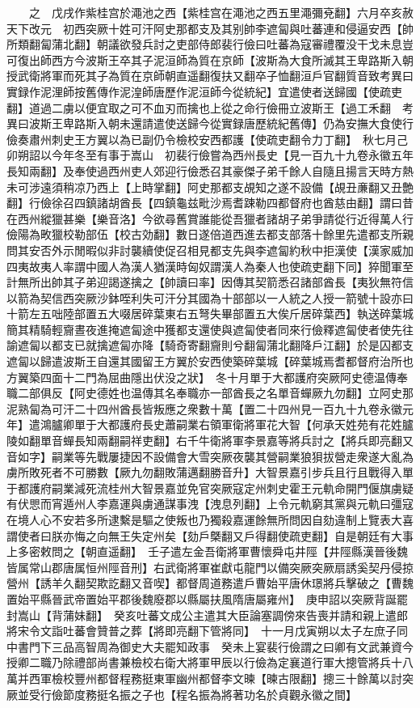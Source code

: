 　　之　戊戌作紫桂宫於澠池之西【紫桂宫在澠池之西五里澠彌兗翻】六月卒亥赦天下改元　初西突厥十姓可汗阿史那都支及其别帥李遮匐與吐蕃連和侵逼安西【帥所類翻匐蒲北翻】朝議欲發兵討之吏部侍郎裴行儉曰吐蕃為寇審禮覆没干戈未息豈可復出師西方今波斯王卒其子泥洹師為質在京師【波斯為大食所滅其王卑路斯入朝授武衛將軍而死其子為質在京師朝直遥翻復扶又翻卒子恤翻洹戶官翻質音致考異曰實録作泥浬師按舊傳作泥湟師唐歷作泥洹師今從統紀】宜遣使者送歸國【使疏吏翻】道過二虜以便宜取之可不血刃而擒也上從之命行儉冊立波斯王【過工禾翻　考異曰波斯王卑路斯入朝未還請遣使送歸今從實録唐歷統紀舊傳】仍為安撫大食使行儉奏肅州刺史王方翼以為已副仍令檢校安西都護【使疏吏翻令力丁翻】　秋七月己卯朔詔以今年冬至有事于嵩山　初裴行儉嘗為西州長史【見一百九十九卷永徽五年長知兩翻】及奉使過西州吏人郊迎行儉悉召其豪傑子弟千餘人自隨且揚言天時方熱未可涉遠須稍凉乃西上【上時掌翻】阿史那都支覘知之遂不設備【覘丑亷翻又丑艶翻】行儉徐召四鎮諸胡酋長【四鎮龜兹毗沙焉耆踈勒四都督府也酋慈由翻】謂曰昔在西州縱獵甚樂【樂音洛】今欲尋舊賞誰能從吾獵者諸胡子弟爭請從行近得萬人行儉陽為畋獵校勒部伍【校古効翻】數日遂倍道西進去都支部落十餘里先遣都支所親問其安否外示閒暇似非討襲續使促召相見都支先與李遮匐約秋中拒漢使【漢家威加四夷故夷人率謂中國人為漢人猶漢時匈奴謂漢人為秦人也使疏吏翻下同】猝聞軍至計無所出帥其子弟迎謁遂擒之【帥讀曰率】因傳其契箭悉召諸部酋長【夷狄無符信以箭為契信西突厥沙鉢咥利失可汗分其國為十部部以一人統之人授一箭號十設亦曰十箭左五咄陸部置五大啜居碎葉東右五弩失畢部置五大俟斤居碎葉西】執送碎葉城簡其精騎輕齎晝夜進掩遮匐途中獲都支還使與遮匐使者同來行儉釋遮匐使者使先往諭遮匐以都支已就擒遮匐亦降【騎奇寄翻齎則兮翻匐蒲北翻降戶江翻】於是囚都支遮匐以歸遣波斯王自還其國留王方翼於安西使築碎葉城【碎葉城焉耆都督府治所也方翼築四面十二門為屈曲隱出伏没之狀】　冬十月單于大都護府突厥阿史德温傳奉職二部俱反【阿史德姓也温傳其名奉職亦一部酋長之名單音蟬厥九勿翻】立阿史那泥熟匐為可汗二十四州酋長皆叛應之衆數十萬【置二十四州見一百九十九卷永徽元年】遣鴻臚卿單于大都護府長史蕭嗣業右領軍衛將軍花大智【何承天姓苑有花姓臚陵如翻單音蟬長知兩翻嗣祥吏翻】右千牛衛將軍李景嘉等將兵討之【將兵即亮翻又音如字】嗣業等先戰屢捷因不設備會大雪突厥夜襲其營嗣業狼狽拔營走衆遂大亂為虜所敗死者不可勝數【厥九勿翻敗蒲邁翻勝音升】大智景嘉引步兵且行且戰得入單于都護府嗣業減死流桂州大智景嘉並免官突厥寇定州刺史霍王元軌命開門偃旗虜疑有伏愳而宵遁州人李嘉運與虜通謀事洩【洩息列翻】上令元軌窮其黨與元軌曰彊寇在境人心不安若多所逮繫是驅之使叛也乃獨殺嘉運餘無所問因自劾違制上覽表大喜謂使者曰朕亦悔之向無王失定州矣【劾戶槩翻又戶得翻使疏吏翻】自是朝廷有大事上多密敕問之【朝直遥翻】　壬子遣左金吾衛將軍曹懷舜屯井陘【井陘縣漢晉後魏皆属常山郡唐属恒州陘音刑】右武衛將軍崔獻屯龍門以備突厥突厥扇誘奚契丹侵掠營州【誘羊久翻契欺訖翻又音喫】都督周道務遣戶曹始平唐休璟將兵擊破之【曹魏置始平縣晉武帝置始平郡後魏廢郡以縣屬扶風隋唐屬雍州】　庚申詔以突厥背誕罷封嵩山【背蒲妹翻】　癸亥吐蕃文成公主遣其大臣論塞調傍來告喪并請和親上遣郎將宋令文詣吐蕃會贊普之葬【將即亮翻下管將同】　十一月戊寅朔以太子左庶子同中書門下三品高智周為御史大夫罷知政事　癸未上宴裴行儉謂之曰卿有文武兼資今授卿二職乃除禮部尚書兼檢校右衛大將軍甲辰以行儉為定襄道行軍大摠管將兵十八萬并西軍檢校豐州都督程務挺東軍幽州都督李文暕【暕古限翻】摠三十餘萬以討突厥並受行儉節度務挺名振之子也【程名振為將著功名於貞觀永徽之間】

